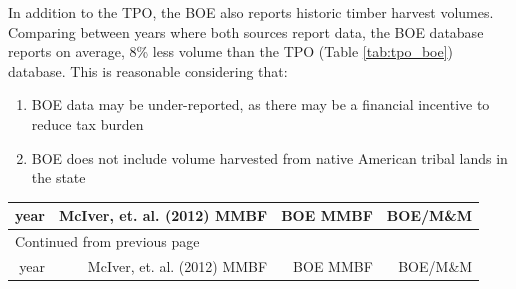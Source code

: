 \documentclass[a4paper,titlepage]{article}
\begin{document}
In addition to the \ac{TPO}, the \ac{BOE} also reports historic timber harvest volumes.  Comparing between years where both sources report data, the BOE database reports on average, 8\% less volume than the TPO (Table \ref{tab:tpo_boe}) database. This is reasonable considering that:

\begin{enumerate}
\item BOE data may be under-reported, as there may be a financial incentive to reduce tax burden
\item BOE does not include volume harvested from native American tribal lands in the state
\end{enumerate}

\begin{longtable}{rrrr}
year & McIver, et. al. (2012) MMBF & BOE MMBF & BOE/M\&M\\
\hline
\endfirsthead
\multicolumn{4}{l}{Continued from previous page} \\
\hline

year & McIver, et. al. (2012) MMBF & BOE MMBF & BOE/M\&M \\


\end{longtable}
\end{document}
